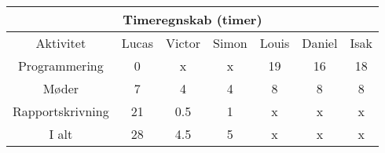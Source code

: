 \centering
\begin{tabular}{ |c|c|c|c|c|c|c|  }
 \hline
 \multicolumn{7}{|c|}{Timeregnskab (timer)} \\
 \hline
 Aktivitet & Lucas & Victor & Simon & Louis & Daniel & Isak\\
 \hline
 
 
 Programmering      & 0 & x & x & 19 & 16 & 18 \\
 
 Møder              & 7 & 4 & 4 & 8 & 8 & 8 \\
 
 Rapportskrivning   & 21 & 0.5 & 1 & x & x & x \\
 
 \hline
 
 I alt              & 28 & 4.5 & 5 & x & x & x \\
 
 
 \hline
\end{tabular}